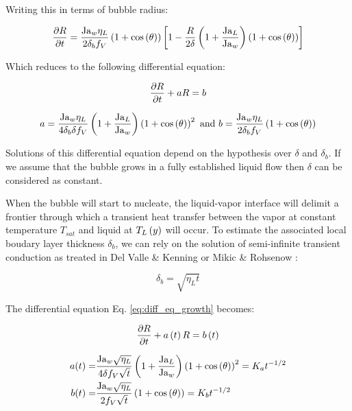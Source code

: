 Writing this in terms of bubble radius:

\begin{align}
\frac{\partial{R}}{\partial t} = \frac{\mathrm{Ja}_{w} \eta_{L}}{2 \delta_{b} f_{V} } \left( 1+\mathrm{cos}\left( \theta \right) \right) \left[ 1 - \frac{R}{2\delta}\left(  1 + \frac{\mathrm{Ja}_{L}}{\mathrm{Ja}_{w}}  \right) \left(  1 + \mathrm{cos}\left( \theta \right)  \right)  \right]
\end{align}

Which reduces to the following differential equation:

\begin{equation}
\frac{\partial{R}}{\partial t} + aR = b
\label{eq:diff_eq_growth}
\end{equation}

\begin{equation}
a = \frac{\mathrm{Ja}_{w}\eta_{L}}{4 \delta_{b} \delta f_{V} } \left( 1 + \frac{\mathrm{Ja}_{L}}{\mathrm{Ja}_{w}}  \right) \left( 1 + \mathrm{cos}\left( \theta \right)  \right)^{2} \ \text{and} \  b = \frac{\mathrm{Ja}_{w}\eta_{L}}{2 \delta_{b} f_{V} }\left( 1 + \mathrm{cos}\left( \theta \right)  \right)
\end{equation}


\npar

Solutions of this differential equation depend on the hypothesis over $\delta$ and $\delta_{b}$. If we assume that the bubble grows in a fully established liquid flow then $\delta$ can be considered as constant.

When the bubble will start to nucleate, the liquid-vapor interface will delimit a frontier through which a transient heat transfer between the vapor at constant temperature $T_{sat}$ and liquid at $T_{L}\left( y \right)$ will occur. To estimate the associated local boudary layer thickness $\delta_{b}$, we can rely on the solution of semi-infinite transient conduction as treated in Del Valle \& Kenning \cite{del_valle_subcooled_1985} or Mikic \& Rohsenow \cite{mikic_bubble_1970}:

\begin{equation}
\delta_{b} = \sqrt{\eta_{L}t}
\label{eq:TBL_expgrowth}
\end{equation}

\npar

The differential equation Eq. \ref{eq:diff_eq_growth} becomes:

\begin{align}
\frac{\partial{R}}{\partial t}+a\left( t \right)R=b\left( t \right)
\end{align}

\begin{align}
a(t)=&\frac{\mathrm{Ja}_{w}\sqrt{\eta_{L}}}{4\delta f_{V}\sqrt{t}}\left( 1+\frac{\mathrm{Ja}_{L}}{\mathrm{Ja}_{w}} \right)\left( 1+\mathrm{cos}\left( \theta \right) \right)^{2}=K_{a}t^{-1/2} \\
b(t)=&\frac{\mathrm{Ja}_{w}\sqrt{\eta_{L}}}{2f_{V} \sqrt{t}}\left( 1+\mathrm{cos}\left( \theta \right) \right)=K_ {b}t^{-1/2}
\label{eq:coeff_expgrowth}
\end{align}

